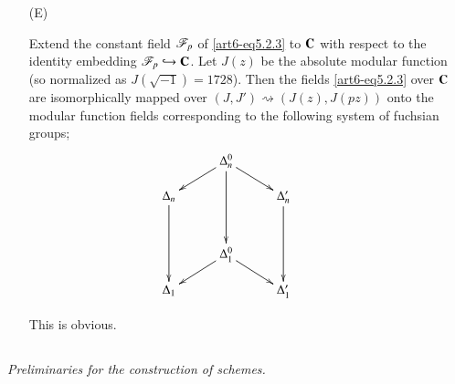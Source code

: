 \begin{itemize}
\begin{proof}
(i) is obvious. To check (ii), it suffices to show that $I^0 = I [J']$. Since $\sK^0_n = \sK_n [J']$, each $z \in \sK^0_n$ can be expressed as $z = \sum\limits^p_{i=0} a_i J'^i (a_i \in \sK_n)$. It suffices to show that ``$a_i \in I (0 \leqslant i \leqslant p)$ and $z \in p I^0$ imply $a_i \in p I (0 \leqslant i \leqslant p)$''. Suppose $a_i \in I (0 \leqslant i \leqslant p)$ and $z \in p I^0$. Then $z \equiv 0 (\mod \fB_n)$ gives $\sum\limits_i \bar{a}_i j^{pi} = 0$, and $z \equiv 0 (\mod \fB'_n)$  gives $\sum\limits_i \bar{a}_i^p j^i =0 $, where $\bar{a}_i$ is an element of $K_n$ reduced from $a_i$. Since $1, j, \ldots, j^{p-1}$ are linearly independent over $K^p_n$, we obtain $\bar{a}_i = 0 (1 \leqslant i \leqslant p -1)$ and $\bar{a}_0 + \bar{a}_p j^{p^2} = \bar{a}_p j = 0$. But $j$ being transcendental over $F_p$, we have $j^{p^2} \neq j$; hence also $\bar{a}_0 = \bar{a}_p = 0$.
\end{proof}

\item[(E)]
\begin{subprop}\label{art6-subprop5.2.8}
Extend the constant field $\mathscr{F}_p$ of \eqref{art6-eq5.2.3} to $\mathbf{C}$ with respect to the identity embedding $\mathscr{F}_p \hookrightarrow \mathbf{C}$. Let $J(z)$ be the absolute modular function (so normalized as $J (\sqrt{-1})= 1728$). Then the fields \eqref{art6-eq5.2.3} over $\mathbf{C}$ are isomorphically mapped over $(J, J') \rightsquigarrow (J(z), J(pz))$ onto the modular function fields corresponding to the following system of fuchsian groups;
$$
\xymatrix@R=0.4cm@C=1cm{
& \Delta^0_n \ar[dr] \ar[dl] \ar[ddd] & \\
\Delta_n \ar[ddd]&&  \Delta'_n \ar[ddd]\\
& & &\\
& \Delta^0_1 \ar[dr] \ar[dl]& \\
\Delta_1 & & \Delta'_1}
$$
\end{subprop}
This is obvious.
\end{itemize}

\subsection{}\label{art6-subsec5.3}
\textit{Preliminaries for the construction of schemes.}

